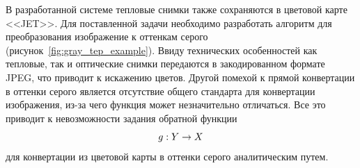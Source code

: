 \documentclass[14pt, a4paper]{extreport}
\begin{document}
	В разработанной системе тепловые снимки также сохраняются в цветовой карте <<JET>>. Для поставленной задачи необходимо разработать алгоритм для преобразования изображение к оттенкам серого (рисунок~\ref{fig:gray_tep_example}). Ввиду технических особенностей как тепловые, так и оптические снимки передаются в закодированном формате JPEG, что приводит к искажению цветов. Другой помехой к прямой конвертации в оттенки серого является отсутствие общего стандарта для конвертации изображения, из-за чего функция может незначительно отличаться. Все это приводит к невозможности задания обратной функции 
	\vspace*{-0.2cm}
	\begin{equation}
		g: Y \rightarrow X
		\label{eq:gYX}
		\vspace*{-0.4cm}
	\end{equation}
	для конвертации из цветовой карты в оттенки серого аналитическим путем. 
\end{document}
